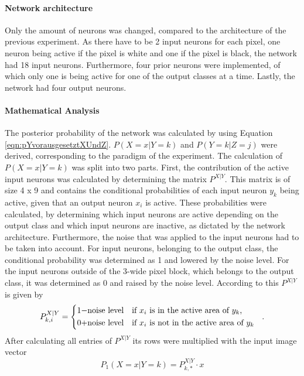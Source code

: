 \paragraph{Network architecture}
Only the amount of neurons was changed, compared to the architecture of the previous experiment. As there have to be 2 input neurons for each pixel, one neuron being active if the pixel is white and one if the pixel is black, the network had 18 input neurons. Furthermore, four prior neurons were implemented, of which only one is being active for one of the output classes at a time. Lastly, the network had four output neurons.

\paragraph{Mathematical Analysis}
The posterior probability of the network was calculated by using Equation \ref{eqn:pYvorausgesetztXUndZ}.
$P(X=x|Y=k)$ and $P(Y=k|Z=j)$ were derived, corresponding to the paradigm of the experiment.
 The calculation of $P(X=x|Y=k)$ was split into two parts. First, the contribution of the active input neurons was calculated by determining the matrix $P^{X|Y}$. This matrix is of size 4 x 9 and contains the conditional probabilities of each input neuron $y_k$ being active, given that an output neuron $x_i$ is active. These probabilities were calculated, by determining which input neurons are active depending on the output class and which input neurons are inactive, as dictated by the network architecture. Furthermore, the noise that was applied to the input neurons had to be taken into account. For input neurons, belonging to the output class, the conditional probability was determined as 1 and lowered by the noise level. For the input neurons outside of the 3-wide pixel block, which belongs to the output class, it was determined as 0 and raised by the noise level. According to this $P^{X|Y}$ is given by
\begin{equation}
\label{eqn:PXvorausgesetztYIf}
P_{k,i}^{X|Y} = \begin{dcases*} 1 - $noise level$ & if $x_i$ is in the active area of $y_k$, \\
0 + $noise level$ & \text{if $x_i$ is not in the active area of $ y_k $ } \end{dcases*}.\end{equation}
  After calculating all entries of $P^{X|Y}$ its rows were multiplied with the input image vector
\begin{equation}
\label{eqn:p1XvorausgesetztYMalX}
P_1(X = x|Y = k) = P^{X|Y}_{k,*} \cdot x
\end{equation}
